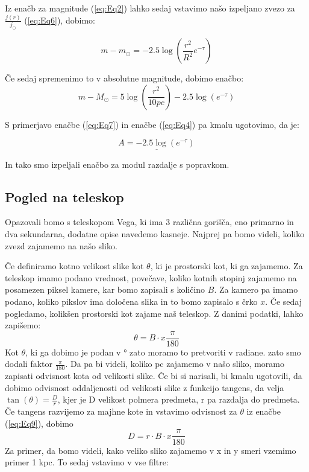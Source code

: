 \documentclass[12pt, a4paper]{article}
\begin{document}
Iz enačb za magnitude (\ref{eq:Eq2}) lahko sedaj vstavimo našo izpeljano zvezo za $\frac{j(r)}{j_{\odot}}$ (\ref{eq:Eq6}), dobimo:

$$m-m_\odot =-2.5 \log\left(\frac{r^2}{R^2}e^{-\tau}\right)$$

Če sedaj spremenimo to v absolutne magnitude, dobimo enačbo:
\begin{equation} \label{eq:Eq7}
	  m-M_\odot =5 \log\left(\frac{r^2}{10 pc}\right)-2.5 \log\left(e^{-\tau}\right)
		\end{equation}
		
S primerjavo enačbe (\ref{eq:Eq7}) in enačbe (\ref{eq:Eq4}) pa kmalu ugotovimo, da je:

\begin{equation} \label{eq:Eq8}
	 \underline{A=-2.5 \log\left(e^{-\tau}\right)}
\end{equation}

In tako smo izpeljali enačbo za modul razdalje s popravkom.

\medskip
\subsection{Pogled na teleskop}
Opazovali bomo s teleskopom Vega, ki ima 3 različna gorišča, eno primarno in dva sekundarna, dodatne opise navedemo kasneje. Najprej pa bomo videli, koliko zvezd zajamemo na našo sliko. \\
\medskip

Če definiramo kotno velikost slike kot $\theta$, ki je prostorski kot, ki ga zajamemo. Za teleskop imamo podano vrednost, povečave, koliko kotnih stopinj zajamemo na posamezen piksel kamere, kar bomo zapisali s količino $B$. Za kamero pa imamo podano, koliko pikslov ima določena slika in to bomo zapisalo s črko $x$. Če sedaj pogledamo, kolikšen prostorski kot zajame naš teleskop. Z danimi podatki, lahko zapišemo:
\begin{equation} \label{eq:Eq9}
	 \theta=B \cdot x \frac{\pi}{180}
	 \end{equation}
Kot $\theta$, ki ga dobimo je podan v ° zato moramo to pretvoriti v radiane. zato smo dodali faktor $\frac{\pi}{180}$. Da pa bi videli, koliko pc zajamemo v našo sliko, moramo zapisati odvisnost kota od velikosti slike. Če bi si narisali, bi kmalu ugotovili, da dobimo odvisnost oddaljenosti od velikosti slike z funkcijo tangens, da velja $\tan(\theta)=\frac{D}{r}$, kjer je D velikost polmera predmeta, r pa razdalja do predmeta. Če tangens razvijemo za majhne kote in vstavimo odvisnost za $\theta$ iz enačbe (\ref{eq:Eq9}), dobimo
\begin{equation} \label{eq:Eq10}
	 D= r \cdot B \cdot x \frac{\pi}{180}
	 \end{equation}
\pagebreak
Za primer, da bomo videli, kako veliko sliko zajamemo v x in y smeri vzemimo primer 1 kpc. To sedaj vstavimo v vse filtre:
\end{document}
